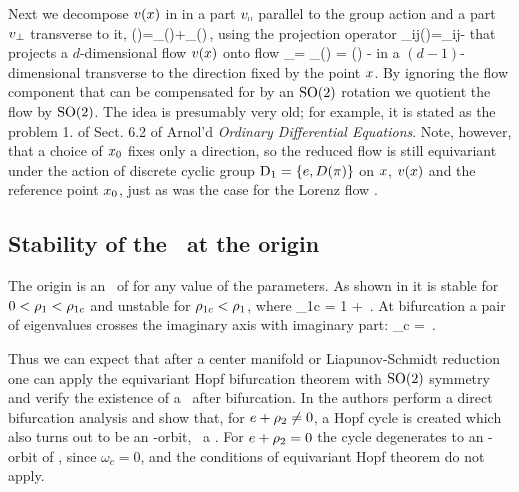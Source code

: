 {Next we decompose $v(x)$
in  in a part $v_\shortparallel$ parallel
to the group action and a part $v_\perp$ transverse to it,
\beq
	\vf(\ssp)=\vf_\shortparallel(\ssp)+\vf_\perp(\ssp)\,,
using the projection operator
\beq
 	\PperpOp_{ij}(\ssp)=\delta_{ij}-
that projects a $d$-dimensional flow $\vf(\ssp)$ onto
flow
\beq
	\dot{\ssp}_\perp = \vf_\perp(\ssp) = \vf(\ssp)
    - \Lg \ssp {}
in a $(d\!-\!1)$-dimensional {\csection} transverse to the
direction fixed by the point $\ssp$.
By ignoring
the flow component that can be compensated for by an
$\SOn{2}$ rotation we quotient the flow by $\SOn{2}$. The
idea is presumably very old; for example, it is stated as the
problem 1. of Sect. 6.2 of Arnol'd {\em Ordinary Differential
Equations}. Note, however, that a choice of
$\ssp_0$ fixes only a direction, so the reduced flow is still
equivariant under the action of discrete cyclic group $\Ztwo
= \{e,D(\pi)\}$ on $\ssp$, $\vf(\ssp)$ and the reference
point $\ssp_0$, just as was the case  for the
Lorenz flow .
}%

\subsection{Stability of the \eqv\ at the origin}
\label{sec:Eqv0}

The origin  is an \eqv\ of  for any
value of the parameters. As shown in  it
is stable for $0<\RerCLor<\rho_{1c}$ and unstable for
$\rho_{1c}<\RerCLor$, where
\beq
	\rho_{1c} = 1 + \,.
\eeq
At bifurcation a pair of eigenvalues crosses the imaginary axis with imaginary part:
\beq
	\omega_c = \,.
	\label{eq:omegaCLE}
\eeq

Thus we can expect that after a center manifold or Liapunov-Schmidt reduction one
can apply the equivariant Hopf bifurcation theorem with $\mathrm{SO}(2)$ symmetry
and verify the existence of a \reqv\ after bifurcation. In  the authors perform a direct bifurcation analysis and
show that, for $e+\rho_2\neq 0$, a Hopf cycle  is created which also turns out to be an -orbit,
\ie\ a \reqv. For $e+\rho_2=0$ the cycle degenerates to an -orbit of \eqva,
since $\omega_c =0$, and the conditions of equivariant Hopf theorem do not apply.

